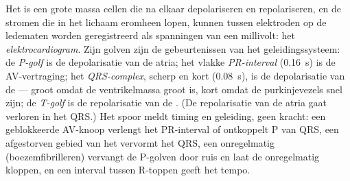 \begin{proposition}\label{prop:b2:heart:ecg}
Het  is een grote massa cellen die na elkaar depolariseren en
repolariseren, en de stromen die in het lichaam eromheen lopen, kunnen tussen
elektroden op de ledematen worden geregistreerd als spanningen van een
millivolt: het \emph{elektrocardiogram}. Zijn golven zijn de gebeurtenissen
van het geleidingssysteem: de \emph{P-golf} is de depolarisatie van de atria;
het vlakke \emph{PR-interval} (\qty{0.16}{s}) is de AV-vertraging; het
\emph{QRS-complex}, scherp en kort (\qty{0.08}{s}), is de depolarisatie van
de  --- groot omdat de ventrikelmassa groot is, kort omdat de
purkinjevezels snel zijn; de \emph{T-golf} is de repolarisatie van de
. (De repolarisatie van de atria gaat verloren in het QRS.) Het
spoor meldt timing en geleiding, geen kracht: een geblokkeerde AV-knoop
verlengt het PR-interval of ontkoppelt P van QRS, een afgestorven gebied van
het  vervormt het QRS, een onregelmatig 
(boezemfibrilleren) vervangt de P-golven door ruis en laat de 
onregelmatig kloppen, en een interval tussen R-toppen geeft het tempo.
\end{proposition}

